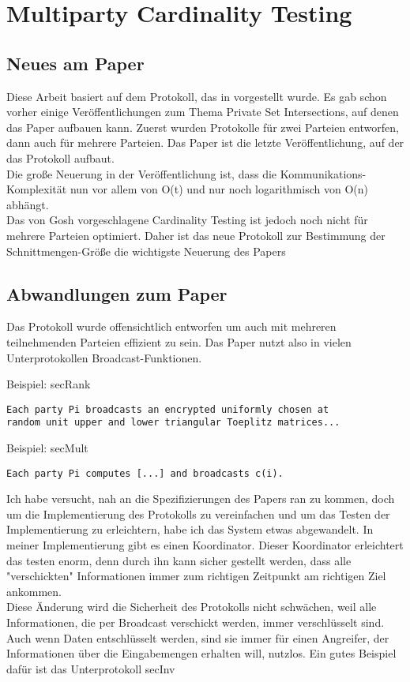 \chapter{Multiparty Cardinality Testing}


\section{Neues am Paper}
Diese Arbeit basiert auf dem Protokoll, das in \cite{Doettling2021} vorgestellt wurde. Es gab schon vorher einige Veröffentlichungen zum Thema Private Set Intersections, auf denen das Paper aufbauen kann. Zuerst wurden Protokolle für zwei Parteien entworfen, dann auch für mehrere Parteien. Das Paper
\cite{Ghosh2019} ist die letzte Veröffentlichung, auf der das Protokoll aufbaut.\\
Die große Neuerung in der Veröffentlichung \cite{Ghosh2019} ist, dass die Kommunikations-Komplexität nun vor allem von O(t) und nur noch logarithmisch von O(n) abhängt. \cite{Ghosh2019}\\
Das von Gosh vorgeschlagene Cardinality Testing ist jedoch noch nicht  für mehrere Parteien optimiert. Daher ist das neue Protokoll zur Bestimmung der Schnittmengen-Größe die wichtigste Neuerung des Papers \cite{Doettling2021}


\section{Abwandlungen zum Paper}
Das Protokoll wurde offensichtlich entworfen um auch mit mehreren teilnehmenden Parteien effizient zu sein.
Das Paper \cite{Doettling2021} nutzt also in vielen Unterprotokollen Broadcast-Funktionen.

Beispiel: secRank \cite{Doettling2021}
\begin{lstlisting}[firstnumber=1]
Each party Pi broadcasts an encrypted uniformly chosen at
random unit upper and lower triangular Toeplitz matrices...
\end{lstlisting}

Beispiel: secMult \cite{Doettling2021}
\begin{lstlisting}[firstnumber=6]
Each party Pi computes [...] and broadcasts c(i).
\end{lstlisting}

Ich habe versucht, nah an die Spezifizierungen des Papers ran zu kommen, doch 
um die Implementierung des Protokolls zu vereinfachen und um das Testen der Implementierung zu erleichtern, habe ich das System etwas abgewandelt. In meiner Implementierung gibt es einen Koordinator. Dieser Koordinator erleichtert das testen enorm, denn durch ihn kann sicher gestellt werden, dass alle "verschickten" Informationen immer zum richtigen Zeitpunkt am richtigen Ziel ankommen.\\
Diese Änderung wird die Sicherheit des Protokolls nicht schwächen, weil alle Informationen, die per Broadcast verschickt werden, immer verschlüsselt sind.
Auch wenn Daten entschlüsselt werden, sind sie immer für einen Angreifer, der Informationen über die Eingabemengen erhalten will, nutzlos. Ein gutes Beispiel dafür ist das Unterprotokoll secInv \\


